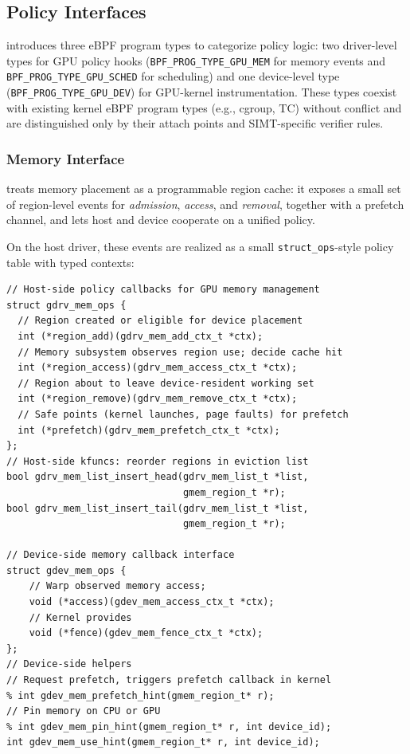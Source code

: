 \subsection{Policy Interfaces}
\label{sec:design-interfaces}

\sys introduces three eBPF program types to categorize policy logic:
two driver-level types for GPU policy hooks (\texttt{BPF\_PROG\_TYPE\_GPU\_MEM} for memory events and \texttt{BPF\_PROG\_TYPE\_GPU\_SCHED} for scheduling) and one device-level type (\texttt{BPF\_PROG\_TYPE\_GPU\_DEV}) for GPU-kernel instrumentation. These types coexist with existing kernel eBPF program types (e.g., cgroup, TC) without conflict and are distinguished only by their attach points and SIMT-specific verifier rules.

\subsubsection{Memory Interface}
\label{sec:design-mem}

\sys treats memory placement as a programmable region
cache: it exposes a small set of region-level events for \emph{admission},
\emph{access}, and \emph{removal}, together with a prefetch channel, and lets host
and device cooperate on a unified policy.

On the host driver, these events are realized as a small \texttt{struct\_ops}-style policy
table with typed contexts:

\begin{verbatim}
// Host-side policy callbacks for GPU memory management
struct gdrv_mem_ops {
  // Region created or eligible for device placement
  int (*region_add)(gdrv_mem_add_ctx_t *ctx);
  // Memory subsystem observes region use; decide cache hit
  int (*region_access)(gdrv_mem_access_ctx_t *ctx);
  // Region about to leave device-resident working set
  int (*region_remove)(gdrv_mem_remove_ctx_t *ctx);
  // Safe points (kernel launches, page faults) for prefetch
  int (*prefetch)(gdrv_mem_prefetch_ctx_t *ctx);
};
// Host-side kfuncs: reorder regions in eviction list
bool gdrv_mem_list_insert_head(gdrv_mem_list_t *list,
                               gmem_region_t *r);
bool gdrv_mem_list_insert_tail(gdrv_mem_list_t *list,
                               gmem_region_t *r);

// Device-side memory callback interface
struct gdev_mem_ops {
    // Warp observed memory access;
    void (*access)(gdev_mem_access_ctx_t *ctx);
    // Kernel provides
    void (*fence)(gdev_mem_fence_ctx_t *ctx);
};
// Device-side helpers
// Request prefetch, triggers prefetch callback in kernel
% int gdev_mem_prefetch_hint(gmem_region_t* r);
// Pin memory on CPU or GPU
% int gdev_mem_pin_hint(gmem_region_t* r, int device_id);
int gdev_mem_use_hint(gmem_region_t* r, int device_id);
\end{verbatim}

